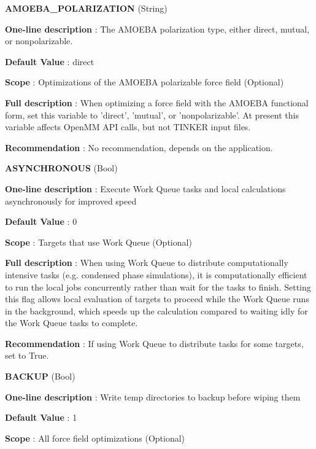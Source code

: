 \begin{DoxyItemize}
\item {\bfseries  \-A\-M\-O\-E\-B\-A\-\_\-\-P\-O\-L\-A\-R\-I\-Z\-A\-T\-I\-O\-N } (\-String) \par
{\bfseries  \-One-\/line description }\-: \-The \-A\-M\-O\-E\-B\-A polarization type, either direct, mutual, or nonpolarizable. \par
{\bfseries  \-Default \-Value }\-: direct \par
{\bfseries  \-Scope }\-: \-Optimizations of the \-A\-M\-O\-E\-B\-A polarizable force field (\-Optional) \par
{\bfseries  \-Full description }\-: \-When optimizing a force field with the \-A\-M\-O\-E\-B\-A functional form, set this variable to 'direct', 'mutual', or 'nonpolarizable'. \-At present this variable affects \-Open\-M\-M \-A\-P\-I calls, but not \-T\-I\-N\-K\-E\-R input files. \par
{\bfseries  \-Recommendation }\-: \-No recommendation, depends on the application.\end{DoxyItemize}
\begin{DoxyItemize}
\item {\bfseries  \-A\-S\-Y\-N\-C\-H\-R\-O\-N\-O\-U\-S } (\-Bool) \par
{\bfseries  \-One-\/line description }\-: \-Execute \-Work \-Queue tasks and local calculations asynchronously for improved speed \par
{\bfseries  \-Default \-Value }\-: 0 \par
{\bfseries  \-Scope }\-: \-Targets that use \-Work \-Queue (\-Optional) \par
{\bfseries  \-Full description }\-: \-When using \-Work \-Queue to distribute computationally intensive tasks (e.\-g. condensed phase simulations), it is computationally efficient to run the local jobs concurrently rather than wait for the tasks to finish. \-Setting this flag allows local evaluation of targets to proceed while the \-Work \-Queue runs in the background, which speeds up the calculation compared to waiting idly for the \-Work \-Queue tasks to complete. \par
{\bfseries  \-Recommendation }\-: \-If using \-Work \-Queue to distribute tasks for some targets, set to \-True.\end{DoxyItemize}
\begin{DoxyItemize}
\item {\bfseries  \-B\-A\-C\-K\-U\-P } (\-Bool) \par
{\bfseries  \-One-\/line description }\-: \-Write temp directories to backup before wiping them \par
{\bfseries  \-Default \-Value }\-: 1 \par
{\bfseries  \-Scope }\-: \-All force field optimizations (\-Optional)\end{DoxyItemize}
